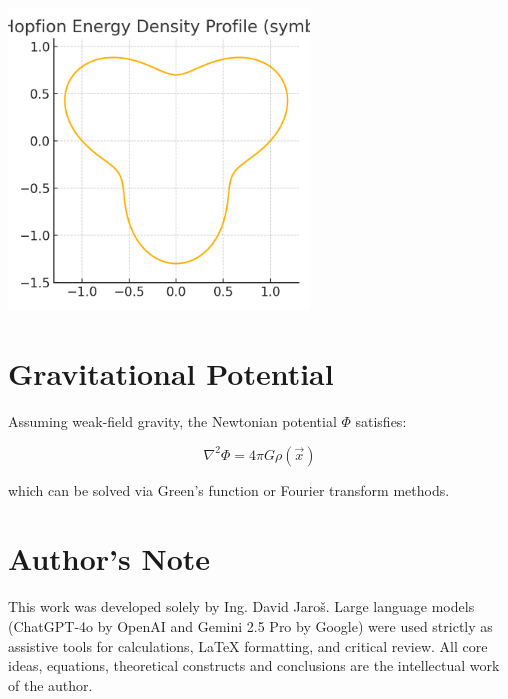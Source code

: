 \documentclass[12pt]{article}
\begin{document}
\begin{center}
\includegraphics[width=0.6\textwidth]{hopfion_profile.png}
\end{center}

\section{Gravitational Potential}
Assuming weak-field gravity, the Newtonian potential \( \Phi \) satisfies:

\[
\nabla^2 \Phi = 4\pi G \rho(\vec{x})
\]

which can be solved via Green’s function or Fourier transform methods.


\section*{Author's Note}

This work was developed solely by Ing. David Jaroš.  
Large language models (ChatGPT-4o by OpenAI and Gemini 2.5 Pro by Google) were used strictly as assistive tools for calculations, LaTeX formatting, and critical review.  
All core ideas, equations, theoretical constructs and conclusions are the intellectual work of the author.
\end{document}
